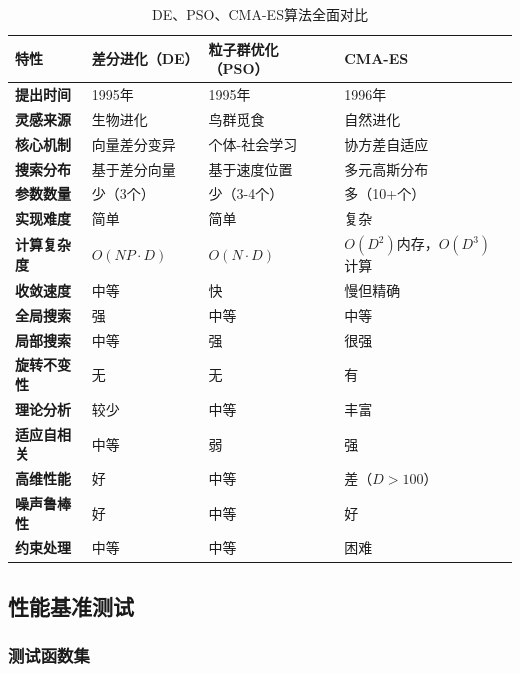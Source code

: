 \begin{table}[H]
\centering
\caption{DE、PSO、CMA-ES算法全面对比}
\begin{tabular}{p{}p{}p{}p{}}
\toprule
\textbf{特性} & \textbf{差分进化（DE）} & \textbf{粒子群优化（PSO）} & \textbf{CMA-ES} \\
\midrule
\textbf{提出时间} & 1995年 & 1995年 & 1996年 \\
\textbf{灵感来源} & 生物进化 & 鸟群觅食 & 自然进化 \\
\textbf{核心机制} & 向量差分变异 & 个体-社会学习 & 协方差自适应 \\
\textbf{搜索分布} & 基于差分向量 & 基于速度位置 & 多元高斯分布 \\
\textbf{参数数量} & 少（3个） & 少（3-4个） & 多（10+个） \\
\textbf{实现难度} & 简单 & 简单 & 复杂 \\
\textbf{计算复杂度} & $O(NP \cdot D)$ & $O(N \cdot D)$ & $O(D^2)$内存，$O(D^3)$计算 \\
\textbf{收敛速度} & 中等 & 快 & 慢但精确 \\
\textbf{全局搜索} & 强 & 中等 & 中等 \\
\textbf{局部搜索} & 中等 & 强 & 很强 \\
\textbf{旋转不变性} & 无 & 无 & 有 \\
\textbf{理论分析} & 较少 & 中等 & 丰富 \\
\textbf{适应自相关} & 中等 & 弱 & 强 \\
\textbf{高维性能} & 好 & 中等 & 差（$D>100$） \\
\textbf{噪声鲁棒性} & 好 & 中等 & 好 \\
\textbf{约束处理} & 中等 & 中等 & 困难 \\
\bottomrule
\end{tabular}
\end{table}

\subsection{性能基准测试}

\subsubsection{测试函数集}

